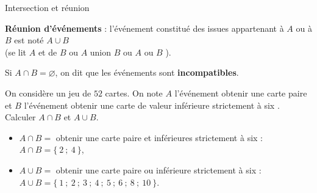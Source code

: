 \documentclass[10pt,a4paper,openany,twoside, prof]{book}
\begin{document}
\begin{defi}{Intersection et réunion}{}
\begin{minipage}{5cm}
\begin{center}
\end{center}
\end{minipage}
\begin{minipage}{9.5cm}
\textbf{Réunion d'événements} : l'événement constitué des issues appartenant à $A$ ou à $B$ est noté $A\cup B$ \\(se lit $A$ et de $B$ ou \og $A$ union $B$ \fg{} ou \og $A$ ou $B$ \fg).
\end{minipage}
\end{defi}

\begin{rem}{}{}
   Si $A\cap B=\varnothing$, on dit que les événements sont \textbf{incompatibles}.
\end{rem}

\begin{ex}{}{}
   On considère un jeu de $52$ cartes. On note $A$ l'événement \og obtenir une carte paire \fg{} et $B$ l'événement \og obtenir une carte de valeur inférieure strictement à six \fg. Calculer $A\cap B$ et $A \cup B$.
   \begin{reponse}
      \begin{itemize}
         \item[] $A\cap B=$ \og obtenir une carte paire et inférieures strictement à six \fg{} : $A \cap B=\{~2~;~4~\}$,
         \item[] $A \cup B=$ \og obtenir une carte paire ou inférieure strictement à six \fg{} : $A \cup B=\{~1~;~2~;~3~;~4~;~5~;~6~;~8~;~10~\}$.
      \end{itemize}
   \end{reponse}
\end{ex}
\end{document}
